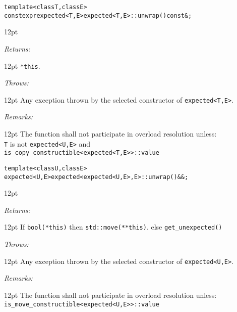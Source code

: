 \documentclass[a4paper,10pt]{article}
\newcommand{\cpp}[1]{\lstinline{#1}}
\newcommand{\wordingItem}[1]{\noindent\textit{#1:}}
\newenvironment{wordingTextItem}[1]{\wordingItem{#1}\vspace{2pt}\noindent\begin{adjustwidth}{12pt}{}}{\vspace{2pt}\end{adjustwidth}}
\newenvironment{wordingPara}{\begin{adjustwidth}{12pt}{}}{\end{adjustwidth}}
\begin{document}
\begin{alltt}
    template <class T, class E>
    constexpr expected<T,E> expected<T,E>::unwrap() const&;
\end{alltt}

\begin{wordingPara}

\begin{wordingTextItem}{Returns}
\cpp{*this}.
\end{wordingTextItem}

\begin{wordingTextItem}{Throws}
Any exception thrown by the selected constructor of \cpp{expected<T,E>}.
\end{wordingTextItem}

\begin{wordingTextItem}{Remarks}
The function shall not participate in overload resolution unless: \\
\cpp{T} is not  \cpp{expected<U,E>}  and \\
\cpp{is_copy_constructible<expected<T,E>>::value} \\
\end{wordingTextItem}

\end{wordingPara}

\begin{alltt}
    template <class U, class E>
    expected<U,E> expected<expected<U,E>, E>::unwrap() &&;
\end{alltt}

\begin{wordingPara}

\begin{wordingTextItem}{Returns}
If \cpp{bool(*this)} then \cpp{std::move(**this)}.
else \cpp{get_unexpected()}
\end{wordingTextItem}

\begin{wordingTextItem}{Throws}
Any exception thrown by the selected constructor of \cpp{expected<U,E>}.
\end{wordingTextItem}

\begin{wordingTextItem}{Remarks}
The function shall not participate in overload resolution unless: \\
\cpp{is_move_constructible<expected<U,E>>::value} \\
\end{wordingTextItem}

\end{wordingPara}
\end{document}
